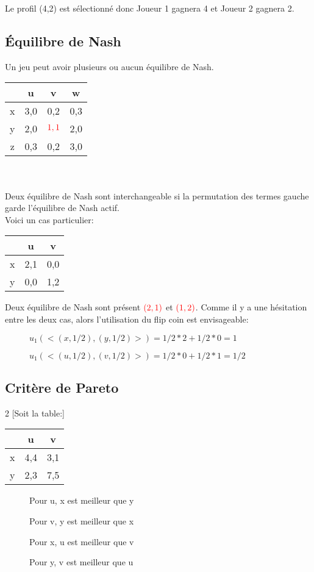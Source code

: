 Le profil (4,2) est sélectionné donc Joueur 1 gagnera 4 et Joueur 2 gagnera 2.\\

\subsection{Équilibre de Nash}

Un jeu peut avoir plusieurs ou aucun équilibre de Nash.\\
\begin{tabular}{c|ccc}
$ $ & u & v & w\\
\hline
x & 3,0 & 0,2 & 0,3\\
y & 2,0 & $\textcolor{red}{1,1}$ & 2,0\\
z & 0,3 & 0,2 & 3,0\\
\hline
\end{tabular}
\ \\\\
Deux équilibre de Nash sont interchangeable si la permutation des termes gauche garde l'équilibre de Nash actif.\\

Voici un cas particulier:
\begin{tabular}{c|cc}
$ $ & u & v\\
\hline
x & 2,1 & 0,0\\
y & 0,0 & 1,2\\
\end{tabular}

Deux équilibre de Nash sont présent $\textcolor{red}{(2,1)}$ et $\textcolor{red}{(1,2)}$.
Comme il y a une hésitation entre les deux cas, alors l'utilisation du flip coin est envisageable:
\begin{description}
\item[] $u_1(<(x, 1/2), (y, 1/2)>) = 1/2 * 2 + 1/2 * 0 = 1$
\item[] $u_1(<(u, 1/2), (v, 1/2)>) = 1/2 * 0 + 1/2 * 1 = 1/2$
\end{description}

\subsection{Critère de Pareto}

\begin{multicols}{2}
[Soit la table:]

\begin{tabular}{c|cc}
$ $ & u & v\\
\hline
x & 4,4 & 3,1\\
y & 2,3 & 7,5\\
\end{tabular}
\vspace{1.5cm}

\begin{description}
\item[] Pour u, x est meilleur que y
\item[] Pour v, y est meilleur que x
\item[] Pour x, u est meilleur que v
\item[] Pour y, v est meilleur que u
\end{description}

\end{multicols}


